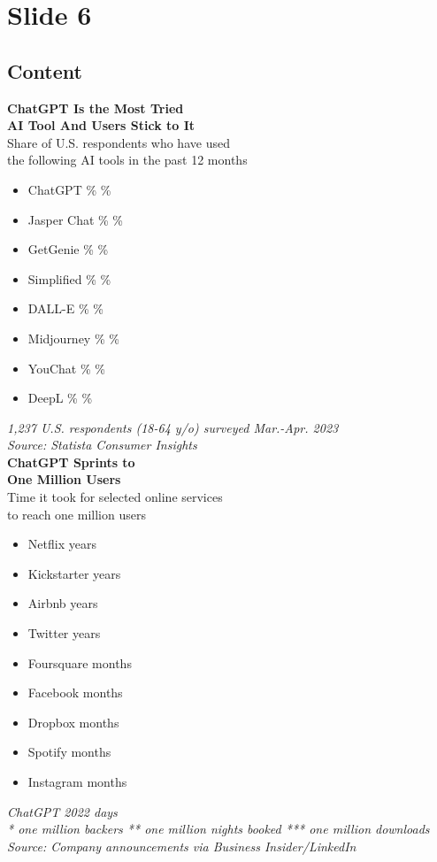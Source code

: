 \documentclass{article}%
\begin{document}
%
\newpage%
\section{Slide 6}%
\label{sec:Slide6}%
\subsection{Content}%

\textbf{ChatGPT Is the Most Tried} \\
\textbf{AI Tool And Users Stick to It} \\
Share of U.S. respondents who have used \\
the following AI tools in the past 12 months \\
\begin{itemize}
    \item ChatGPT \% \%
    \item Jasper Chat \% \%
    \item GetGenie \% \%
    \item Simplified \% \%
    \item DALL-E \% \%
    \item Midjourney \% \%
    \item YouChat \% \%
    \item DeepL \% \%
\end{itemize}
\textit{1,237 U.S. respondents (18-64 y/o) surveyed Mar.-Apr. 2023} \\
\textit{Source: Statista Consumer Insights} \\
\textbf{ChatGPT Sprints to} \\
\textbf{One Million Users} \\
Time it took for selected online services \\
to reach one million users \\
\begin{itemize}
    \item Netflix   years
    \item Kickstarter   years
    \item Airbnb   years
    \item Twitter   years
    \item Foursquare   months
    \item Facebook   months
    \item Dropbox   months
    \item Spotify   months
    \item Instagram   months
\end{itemize}
\textit{ChatGPT 2022  days} \\
\textit{* one million backers ** one million nights booked *** one million downloads} \\
\textit{Source: Company announcements via Business Insider/LinkedIn}
%
\end{document}
